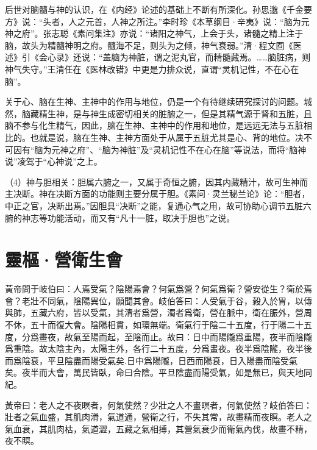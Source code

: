 \documentclass[12pt]{ctexbook}
\begin{document}
后世对脑髓与神的认识，在《内经》论述的基础上不断有所深化。孙思邈《千金要方》说：“头者，人之元首，人神之所注。”李时珍《本草纲目·辛夷》说：“脑为元神之府”。张志聪《素问集注》亦说：“诸阳之神气，上会于头，诸髓之精上注于脑，故头为精髓神明之府。髓海不足，则头为之倾，神气衰弱。”清·程文囿《医述》引《会心录》还说：“盖脑为神脏，谓之泥丸官，而精髓藏焉。……脑脏病，则神气失守。”王清任在《医林改错》中更是力排众说，直谓“灵机记性，不在心在脑”。

关于心、脑在生神、主神中的作用与地位，仍是一个有待继续研究探讨的问题。城然，脑藏精生神，是与神生成密切相关的脏腑之一，但是其精气源于肾和五脏，且脑不参与化生精气，因此，脑在生神、主神中的作用和地位，是远远无法与五脏相比的。也就是说，脑在生神、主神方面处于从属于五脏尤其是心、背的地位。决不可因有“脑为元神之府”、“脑为神脏”及“灵机记性不在心在脑”等说法，而将“脑神说”凌驾于“心神说”之上。

（4）神与胆相关：胆属六腑之一，又属于奇恒之腑，因其内藏精汁，故可生神而主决断。神在决断方面的功能则主要分属于胆。《素问·灵兰秘兰论》论：“胆者，中正之官，决断出焉。”因胆具“决断”之能，复通心气之用，故可协助心调节五脏六腑的神志等功能活动，而又有“凡十一脏，取决于胆也”之说。

\section{靈樞·營衛生會}%


\begin{yuanwen}
黃帝問于岐伯曰：人焉受氣？陰陽焉會？何氣爲營？何氣爲衛？營安從生？衛於焉會？老壯不同氣，陰陽異位，願聞其會。岐伯答曰：人受氣于谷，榖入於胃，以傳與肺，五藏六府，皆以受氣，其清者爲營，濁者爲衛，營在脈中，衛在脤外，營周不休，五十而復大會。陰陽相貫，如環無端。衛氣行于陰二十五度，行于陽二十五度，分爲畫夜，故氣至陽而起，至陰而止。故曰：日中而陽隴爲重陽，夜半而陰隴爲重陰。故太陰主內，太陽主外，各行二十五度，分爲畫夜。夜半爲陰隴，夜半後而爲陰衰，平旦陰盡而陽受氣矣.日中爲陽隴，日西而陽衰，日入陽盡而陰受氣矣。夜半而大會，萬民皆臥，命曰合陰。平旦陰盡而陽受氣，如是無已，與天地同紀。

黃帝曰：老人之不夜瞑者，何氣使然？少壯之人不畫瞑者，何氣使然？岐伯答曰：壯者之氣血盛，其肌肉滑，氣道通，營衛之行，不失其常，故畫精而夜瞑。老人之氣血衰，其肌肉枯，氣道澀，五藏之氣相搏，其營氣衰少而衛氣內伐，故畫不精，夜不瞑。
\end{yuanwen}

\end{document}
